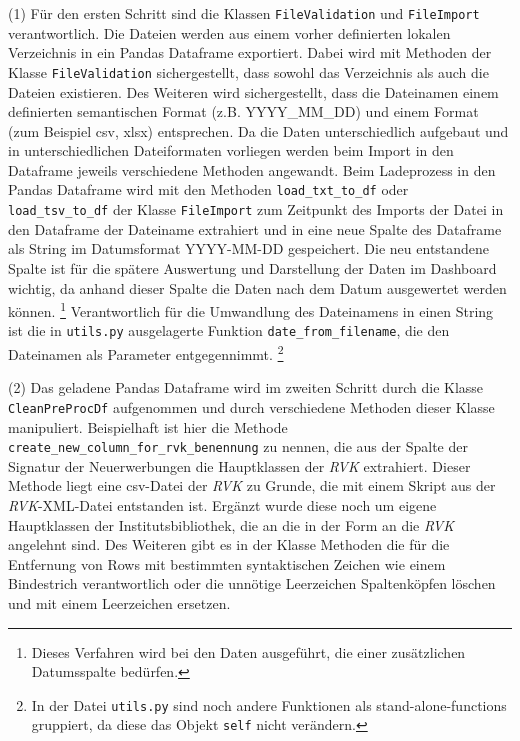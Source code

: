     
    (1) Für den ersten Schritt sind die Klassen \texttt{FileValidation} und \texttt{FileImport} verantwortlich.
    Die Dateien werden aus einem vorher definierten lokalen Verzeichnis in ein Pandas Dataframe exportiert. 
    Dabei wird mit Methoden der Klasse \texttt{FileValidation} sichergestellt, dass sowohl das Verzeichnis als auch die Dateien existieren. 
    Des Weiteren wird sichergestellt, dass die Dateinamen einem definierten semantischen Format (z.B. YYYY\_MM\_DD) und 
    einem Format (zum Beispiel csv, xlsx) entsprechen. Da die Daten unterschiedlich aufgebaut und in unterschiedlichen Dateiformaten vorliegen 
    werden beim Import in den Dataframe jeweils verschiedene Methoden angewandt.
    Beim Ladeprozess in den Pandas Dataframe wird mit den Methoden \texttt{load\_txt\_to\_df} oder \texttt{load\_tsv\_to\_df} der Klasse \texttt{FileImport} 
    zum Zeitpunkt des Imports der Datei in den Dataframe der Dateiname extrahiert und in eine neue Spalte des Dataframe als String 
    im Datumsformat YYYY-MM-DD gespeichert. Die neu entstandene Spalte ist für die spätere Auswertung und Darstellung der Daten im Dashboard wichtig, 
    da anhand dieser Spalte die Daten nach dem Datum ausgewertet werden können.
    \footnote{Dieses Verfahren wird bei den Daten ausgeführt, die einer zusätzlichen Datumsspalte bedürfen.} 
    Verantwortlich für die Umwandlung des Dateinamens in einen String ist die in \texttt{utils.py} ausgelagerte Funktion \texttt{date\_from\_filename},
    die den Dateinamen als Parameter entgegennimmt.
    \footnote{In der Datei \texttt{utils.py} sind noch andere Funktionen als stand-alone-functions gruppiert, da diese das Objekt \texttt{self} nicht verändern.} 
    
    (2) Das geladene Pandas Dataframe wird im zweiten Schritt durch die Klasse \texttt{CleanPreProcDf} aufgenommen und durch verschiedene Methoden dieser Klasse
    manipuliert. Beispielhaft ist hier die Methode \texttt{create\_new\_column\_for\_rvk\_benennung} zu nennen, die aus der Spalte der Signatur 
    der Neuerwerbungen die Hauptklassen der \textit{\acrlong{RVK}} extrahiert. Dieser Methode liegt eine csv-Datei
    der \textit{\acrshort{RVK}} zu Grunde, die mit einem Skript aus der \textit{\acrshort{RVK}}-XML-Datei entstanden ist. Ergänzt wurde diese noch um eigene Hauptklassen 
    der Institutsbibliothek, die an die in der Form an die \textit{\acrshort{RVK}} angelehnt sind. Des Weiteren gibt es in der Klasse Methoden die für die Entfernung von Rows
    mit bestimmten syntaktischen Zeichen wie einem Bindestrich verantwortlich oder die unnötige Leerzeichen Spaltenköpfen löschen und mit einem Leerzeichen ersetzen.
     

